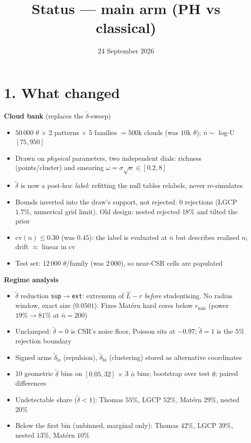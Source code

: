 \documentclass[10pt]{article}
\title{Status --- main arm (PH vs classical)}
\date{24 September 2026}
\newcommand{\dt}{\tilde\delta}
\newcommand{\nb}{\bar n}
\begin{document}
\maketitle
\vspace{-2em}

\section*{1. What changed}

\textbf{Cloud bank} (replaces the $\dt$-sweep)
\begin{itemize}
  \item $50\,000$ $\theta$ $\times$ 2 patterns $\times$ 5 families $=500$k clouds (was $10$k $\theta$); $\nb\sim$ log-U$[75,950]$
  \item Drawn on \emph{physical} parameters, two independent dials: richness (points/cluster) and smearing $\omega=\sigma\sqrt\kappa\in[0.2,8]$
  \item $\dt$ is now a post-hoc \emph{label}: refitting the null tables relabels, never re-simulates
  \item Bounds inverted into the draw's support, not rejected: 0 rejections (LGCP $1.7\%$, numerical grid limit). Old design: nested rejected $18\%$ and tilted the prior
  \item $\mathrm{cv}(n)\le0.30$ (was $0.45$): the label is evaluated at $\nb$ but describes realised $n$; drift $\approx$ linear in cv
  \item Test set: $12\,000$ $\theta$/family (was $2\,000$), so near-CSR cells are populated
\end{itemize}

\textbf{Regime analysis}
\begin{itemize}
  \item $\dt$ reduction \texttt{sup}$\to$\texttt{ext}: extremum of $\hat L-r$ \emph{before} studentising. No radius window, exact size ($0.0501$). Fixes Mat\'ern hard cores below $r_{\min}$ (power $19\%\to81\%$ at $\nb=200$)
  \item Unclamped: $\dt=0$ is CSR's noise floor, Poisson sits at $-0.97$; $\dt=1$ is the $5\%$ rejection boundary
  \item Signed arms $\dt_{\text{lo}}$ (repulsion), $\dt_{\text{hi}}$ (clustering) stored as alternative coordinates
  \item 10 geometric $\dt$ bins on $[0.05,32]$ $\times$ 3 $\nb$ bins; bootstrap over test $\theta$; paired differences
  \item Undetectable share ($\dt<1$): Thomas $55\%$, LGCP $52\%$, Mat\'ern $29\%$, nested $20\%$
  \item Below the first bin (unbinned, marginal only): Thomas $42\%$, LGCP $39\%$, nested $13\%$, Mat\'ern $10\%$
\end{itemize}
\end{document}
